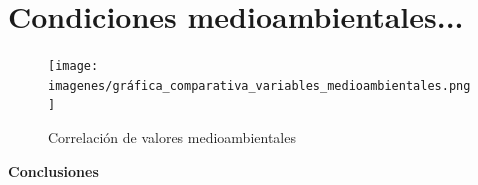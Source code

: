 \newpage

\section{Condiciones medioambientales...} \label{sec: condiciones_medioambientales}


    \begin{figure}[H]
        \centering
        \texttt{[image: imagenes/gráfica\_comparativa\_variables\_medioambientales.png]}
        \caption{Correlación de valores medioambientales}
        \label{imag:grafica_condiciones_medioambientales}
    \end{figure}


        \textbf{\Large Conclusiones}\newline
